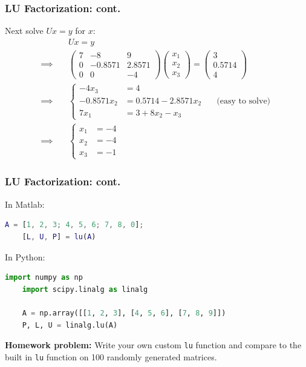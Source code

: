 \documentclass{beamer}
\begin{document}
\begin{frame}\frametitle{LU Factorization: cont.}
	Next solve $Ux = y$ for $x$:
	\begin{align*}
		& Ux = y \\
		\implies \quad & 	
		\begin{pmatrix}
    		7 & -8 & 9\\
    		0 & -0.8571 & 2.8571\\
    		0 & 0 & -4
    	\end{pmatrix}
    	\begin{pmatrix}
    		x_1 \\ x_2 \\ x_3	
    	\end{pmatrix}
		= 
		\begin{pmatrix}
			3 \\ 0.5714 \\ 4
		\end{pmatrix} \\
		\implies \quad & 
		\left\{
			\begin{array}{rlr}
				-4x_3 &= 4\\
				-0.8571x_2 &= 0.5714 - 2.8571x_2 
					& \quad \text{(easy to solve)}\\
				7x_1 &= 3 + 8x_2 - x_3		
			\end{array} 
		\right. \\
		\implies \quad & 
		\left\{
			\begin{array}{ll}
				x_1 &= -4\\
				x_2 &= -4\\
				x_3 &= -1		
			\end{array}
		\right.
	\end{align*}	
\end{frame}

\begin{frame}[fragile]\frametitle{LU Factorization: cont.}
{\small
In Matlab:
	
\begin{lstlisting}[language=Matlab]
    A = [1, 2, 3; 4, 5, 6; 7, 8, 0];
    [L, U, P] = lu(A)	
\end{lstlisting}

\vfill
	
In Python:

\begin{lstlisting}[language=Python]
    import numpy as np
    import scipy.linalg as linalg
		
    A = np.array([[1, 2, 3], [4, 5, 6], [7, 8, 9]])
    P, L, U = linalg.lu(A)
\end{lstlisting}	
}

\vfill

{\bf Homework problem:}  Write your own custom \texttt{lu} function and compare to the built in \texttt{lu} function on 100 randomly generated matrices.
\end{frame}
\end{document}
